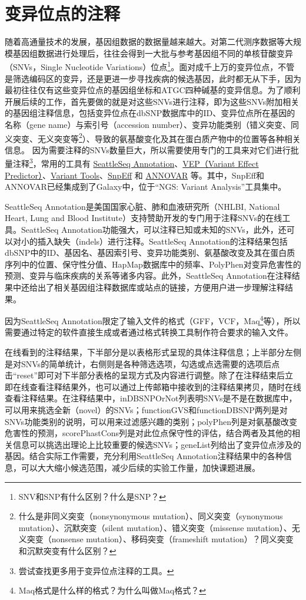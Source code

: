 \documentclass[11pt,a4paper,twoside]{book}
\begin{document}
\section{变异位点的注释}
随着高通量技术的发展，基因组数据的数据量越来越大。对第二代测序数据等大规模基因组数据进行处理后，往往会得到一大批与参考基因组不同的单核苷酸变异（SNVs，Single Nucleotide Variations）位点\footnote{SNV和SNP有什么区别？什么是SNP？}。面对成千上万的变异位点，不管是筛选编码区的变异，还是更进一步寻找疾病的候选基因，此时都无从下手，因为最初往往仅有这些变异位点的基因组坐标和ATGC四种碱基的变异信息。为了顺利开展后续的工作，首先要做的就是对这些SNVs进行注释，即为这些SNVs附加相关的基因组注释信息，包括变异位点在dbSNP数据库中的ID、变异位点所在基因的名称（gene name）与索引号（accession number）、变异功能类别（错义突变、同义突变、无义突变等\footnote{什么是非同义突变（nonsynonymous mutation）、同义突变（synonymous mutation）、沉默突变（silent mutation）、错义突变（missense mutation）、无义突变（nonsense mutation）、移码突变（frameshift mutation）？同义突变和沉默突变有什么区别？}）、导致的氨基酸变化及其在蛋白质产物中的位置等各种相关信息。 因为需要注释的SNVs数量巨大，所以需要使用专门的工具来对它们进行批量注释\footnote{尝试查找更多用于变异位点注释的工具。}，常用的工具有 \href{http://snp.gs.washington.edu/SeattleSeqAnnotation137/index.jsp}{SeattleSeq Annotation}、\href{https://asia.ensembl.org/info/docs/tools/vep/index.html}{VEP（Variant Effect Predictor）}、\href{http://varianttools.sourceforge.net}{Variant Tools}、\href{http://snpeff.sourceforge.net}{SnpEff} 和 \href{http://annovar.openbioinformatics.org}{ANNOVAR} 等。其中，SnpEff和ANNOVAR已经集成到了Galaxy中，位于“NGS: Variant Analysis”工具集中。

SeattleSeq Annotation是美国国家心脏、肺和血液研究所（NHLBI, National Heart, Lung and Blood Institute）支持赞助开发的专门用于注释SNVs的在线工具。SeattleSeq Annotation功能强大，可以注释已知或未知的SNVs，此外，还可以对小的插入缺失（indels）进行注释。SeattleSeq Annotation的注释结果包括dbSNP中的ID、基因名、基因索引号、变异功能类别、氨基酸改变及其在蛋白质序列中的位置、保守性分值、HapMap数据库中的频率、PolyPhen对变异危害性的预测、变异与临床疾病的关系等诸多内容。此外，SeattleSeq Annotation在注释结果中还给出了相关基因组注释数据库或站点的链接，方便用户进一步理解注释结果。

因为SeattleSeq Annotation限定了输入文件的格式（GFF，VCF，Maq\footnote{Maq格式是什么样的格式？为什么叫做Maq格式？}等），所以需要通过特定的软件直接生成或者通过格式转换工具制作符合要求的输入文件。

在线看到的注释结果，下半部分是以表格形式呈现的具体注释信息；上半部分左侧是对SNVs的简单统计，右侧则是各种筛选选项，勾选或点选需要的选项后点击“reset”即可对下半部分表格的呈现方式及内容进行调整。除了在注释结束后立即在线查看注释结果外，也可以通过上传邮箱中接收到的注释结果拷贝，随时在线查看注释结果。在注释结果中，inDBSNPOrNot列表明SNVs是不是在数据库中，可以用来挑选全新（novel）的SNVs；functionGVS和functionDBSNP两列是对SNVs功能类别的说明，可以用来过滤感兴趣的类别；polyPhen列是对氨基酸改变危害性的预测，scorePhastCons列是对此位点保守性的评估，结合两者及其他的相关信息可以挑选出理论上比较重要的候选SNVs；geneList列给出了变异位点涉及的基因。结合实际工作需要，充分利用SeattleSeq Annotation注释结果中的各种信息，可以大大缩小候选范围，减少后续的实验工作量，加快课题进展。
\end{document}
